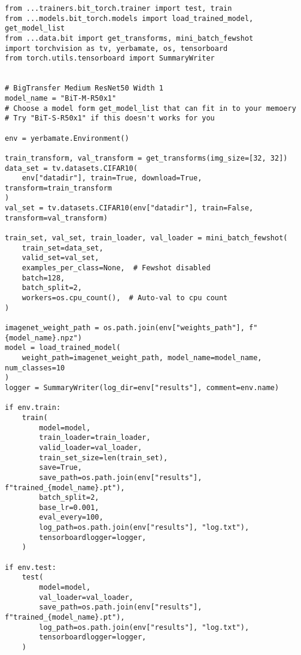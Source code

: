 \begin{verbatim}
from ...trainers.bit_torch.trainer import test, train
from ...models.bit_torch.models import load_trained_model, get_model_list
from ...data.bit import get_transforms, mini_batch_fewshot
import torchvision as tv, yerbamate, os, tensorboard
from torch.utils.tensorboard import SummaryWriter


# BigTransfer Medium ResNet50 Width 1
model_name = "BiT-M-R50x1"
# Choose a model form get_model_list that can fit in to your memoery
# Try "BiT-S-R50x1" if this doesn't works for you

env = yerbamate.Environment()

train_transform, val_transform = get_transforms(img_size=[32, 32])
data_set = tv.datasets.CIFAR10(
    env["datadir"], train=True, download=True, transform=train_transform
)
val_set = tv.datasets.CIFAR10(env["datadir"], train=False, transform=val_transform)

train_set, val_set, train_loader, val_loader = mini_batch_fewshot(
    train_set=data_set,
    valid_set=val_set,
    examples_per_class=None,  # Fewshot disabled
    batch=128,
    batch_split=2,
    workers=os.cpu_count(),  # Auto-val to cpu count
)

imagenet_weight_path = os.path.join(env["weights_path"], f"{model_name}.npz")
model = load_trained_model(
    weight_path=imagenet_weight_path, model_name=model_name, num_classes=10
)
logger = SummaryWriter(log_dir=env["results"], comment=env.name)

if env.train:
    train(
        model=model,
        train_loader=train_loader,
        valid_loader=val_loader,
        train_set_size=len(train_set),
        save=True,
        save_path=os.path.join(env["results"], f"trained_{model_name}.pt"),
        batch_split=2,
        base_lr=0.001,
        eval_every=100,
        log_path=os.path.join(env["results"], "log.txt"),
        tensorboardlogger=logger,
    )

if env.test:
    test(
        model=model,
        val_loader=val_loader,
        save_path=os.path.join(env["results"], f"trained_{model_name}.pt"),
        log_path=os.path.join(env["results"], "log.txt"),
        tensorboardlogger=logger,
    )

\end{verbatim}




